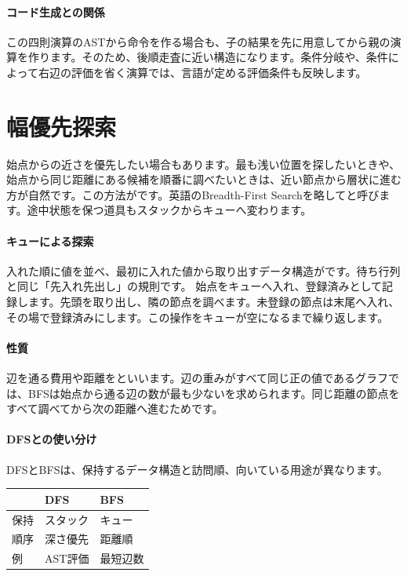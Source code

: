 \par
\endgroup
\medskip
\begingroup
\paragraph{コード生成との関係}
        この四則演算のASTから命令を作る場合も、子の結果を先に用意してから親の演算を作ります。そのため、後順走査に近い構造になります。条件分岐や、条件によって右辺の評価を省く演算では、言語が定める評価条件も反映します。

\par
\endgroup
\par
\endgroup


\section{幅優先探索}
\label{sec:02-language-13}

始点からの近さを優先したい場合もあります。最も浅い位置を探したいときや、始点から同じ距離にある候補を順番に調べたいときは、近い節点から層状に進む方が自然です。この方法がです。英語のBreadth-First Searchを略してと呼びます。途中状態を保つ道具もスタックからキューへ変わります。

\begingroup
\begingroup
\paragraph{キューによる探索}
        入れた順に値を並べ、最初に入れた値から取り出すデータ構造がです。待ち行列と同じ「先入れ先出し」の規則です。
        始点をキューへ入れ、登録済みとして記録します。先頭を取り出し、隣の節点を調べます。未登録の節点は末尾へ入れ、その場で登録済みにします。この操作をキューが空になるまで繰り返します。

\paragraph{性質}
        辺を通る費用や距離をといいます。辺の重みがすべて同じ正の値であるグラフでは、BFSは始点から通る辺の数が最も少ないを求められます。同じ距離の節点をすべて調べてから次の距離へ進むためです。

\par
\endgroup
\medskip
\begingroup
\paragraph{DFSとの使い分け}
        DFSとBFSは、保持するデータ構造と訪問順、向いている用途が異なります。
        \begin{tabularx}{\linewidth}{@{}lYY@{}}
          \toprule
          & DFS & BFS\\
          \midrule
          保持 & スタック & キュー\\
          順序 & 深さ優先 & 距離順\\
          例 & AST評価 & 最短辺数\\
          \bottomrule
        \end{tabularx}

